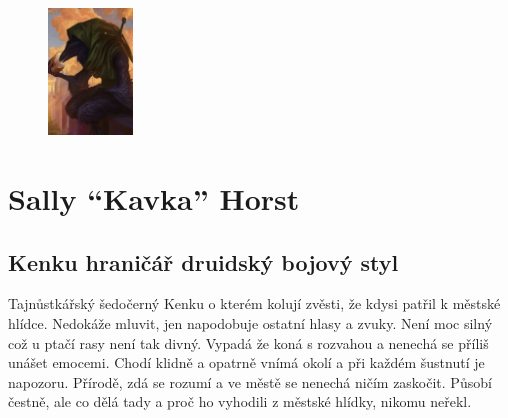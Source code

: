 \documentclass[letterpaper,onecolumn,openany,nodeprecatedcode]{dndbook}
\begin{document}
\begin{figure}
    \begin{center}
        \includegraphics[width=0.2\textwidth]{img/sally.jpg} 
    \end{center}
\end{figure}

\section{Sally “Kavka” Horst}
\subsection{Kenku hraničář druidský bojový styl}
Tajnůstkářský šedočerný Kenku o kterém kolují zvěsti, že kdysi patřil k městské hlídce. Nedokáže mluvit, jen napodobuje ostatní hlasy a zvuky. Není moc silný což u ptačí rasy není tak divný. Vypadá že koná s rozvahou a nenechá se příliš unášet emocemi. Chodí klidně a opatrně vnímá okolí a při každém šustnutí je napozoru. Přírodě, zdá se rozumí a ve městě se nenechá ničím zaskočit. Působí čestně, ale co dělá tady a proč ho vyhodili z městské hlídky, nikomu neřekl.
\end{document}
